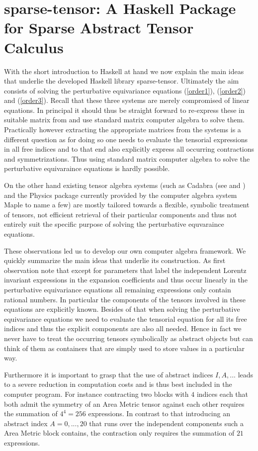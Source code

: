 \documentclass[a4paper,12pt, DIV=14, BCOR=5mm, twoside, headsepline, numbers=noenddot]{scrbook}
\begin{document}
\section{sparse-tensor: A Haskell Package for Sparse Abstract Tensor Calculus}
With the short introduction to Haskell at hand we now explain the main ideas that underlie the developed Haskell library sparse-tensor. Ultimately the aim consists of solving the perturbative equivariance equations (\ref{order1}), (\ref{order2}) and (\ref{order3}). Recall that these three systems are merely compromised of linear equations. In principal it should thus be straight forward to re-express these in suitable matrix from and use standard matrix computer algebra to solve them. Practically however extracting the appropriate matrices from the systems is a different question as for doing so one needs to evaluate the tensorial expressions in all free indices and to that end also
explicitly express all occurring contractions and symmetrizations.
Thus using standard matrix computer algebra to solve the perturbative equivaraince equations is hardly possible.

On the other hand existing tensor algebra systems (such as Cadabra (see \cite{cadabra1} and \cite{cadabra2}) and the Physics package currently provided by the computer algebra system Maple to name a few) are mostly tailored towards a flexible, symbolic treatment of tensors, not efficient retrieval of their particular components and thus not entirely suit the specific purpose of solving the perturbative equvaraince equations. 

These observations led us to develop our own computer algebra framework. We quickly summarize the main ideas that underlie its construction.
As first observation note that except for parameters that label the independent Lorentz invariant expressions in the expansion coefficients and thus occur linearly in the perturbative equivariance equations all remaining expressions only contain rational numbers. In particular the components of the tensors involved in these equations are explicitly known. Besides of that when solving the perturbative equivariance equations we need to evaluate the tensorial equation for all its free indices and thus the explicit components are also all needed. Hence in fact we never have to treat the occurring tensors symbolically as abstract objects but can think of them as containers that are simply used to store values in a particular way. 

Furthermore it is important to grasp that the use of abstract indices $I, A, ...$ leads to a severe reduction in computation costs and is thus best included in the computer program. For instance contracting two blocks with $4$ indices each that both admit the symmetry of an Area Metric tensor against each other requires the summation of $4^4 = 256$ expressions. In contrast to that introducing an abstract index $A = 0,...,20$ that runs over the independent components such a Area Metric block contains, the contraction only requires the summation of $21$ expressions.
\end{document}
